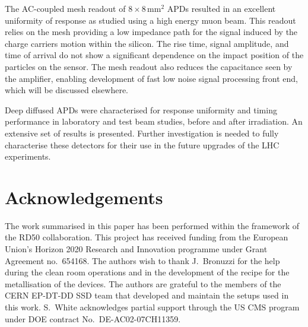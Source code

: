 \documentclass[review,number,sort&compress]{elsarticle}
\begin{document}
The AC-coupled mesh readout of $8 \times 8$\,mm$^2$ APDs resulted in an excellent uniformity of response as studied using a high energy muon beam.
This readout relies on the mesh providing a low impedance path for the signal induced by the charge carriers motion within the silicon.
The rise time, signal amplitude, and time of arrival do not show a significant dependence on the impact position of the particles on the sensor.
The mesh readout also reduces the capacitance seen by the amplifier, enabling development of fast low noise signal processing front end, which will be discussed elsewhere.

Deep diffused APDs were characterised for response uniformity and timing performance in laboratory and test beam studies, before and after irradiation.
An extensive set of results is presented.
Further investigation is needed to fully characterise these detectors for their use in the future upgrades of the LHC experiments.

\section*{Acknowledgements}

The work summarised in this paper has been performed within the framework of the RD50 collaboration.
This project has received funding from the European Union’s Horizon 2020 Research and Innovation programme under Grant Agreement no.\ 654168.
The authors wish to thank J.~Bronuzzi for the help during the clean room operations and in the development of the recipe for the metallisation of the devices.
The authors are grateful to the members of the CERN EP-DT-DD SSD team that developed and maintain the setups used in this work.
S.\ White acknowledges partial support through the US CMS program under DOE contract No.\ DE-AC02-07CH11359.

%
%

\end{document}
